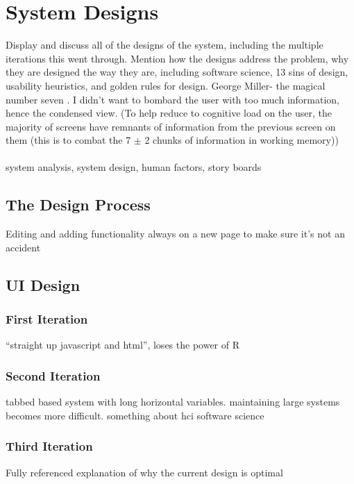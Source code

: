 \section{System Designs}
{\color{red} 
Display and discuss all of the designs of the system, including the multiple iterations this went through. Mention how the designs address the problem, why they are designed the way they are, including software science, 13 sins of design, usability heuristics, and golden rules for design.
}
{\color{red}
George Miller- the magical number seven \cite{miller1956magical}.
I didn't want to bombard the user with too much information, hence the condensed view. (To help reduce to cognitive load on the user, the majority of screens have remnants of information from the previous screen on them (this is to combat the 7 $\pm$ 2 chunks of information in working memory))\ \\
\ \\
system analysis, system design, human factors, story boards
}


\subsection{The Design Process}
{\color{red} Editing and adding functionality always on a new page to make sure it's not an accident }



\subsection{UI Design}
{\color{red}  }


	\subsubsection{First Iteration}
	{\color{red} ``straight up javascript and html'', loses the power of R }



	\subsubsection{Second Iteration}
	{\color{red} tabbed based system with long horizontal variables. maintaining large systems becomes more difficult. something about hci software science }


	\subsubsection{Third Iteration}		
	{\color{red} Fully referenced explanation of why the current design is optimal }


